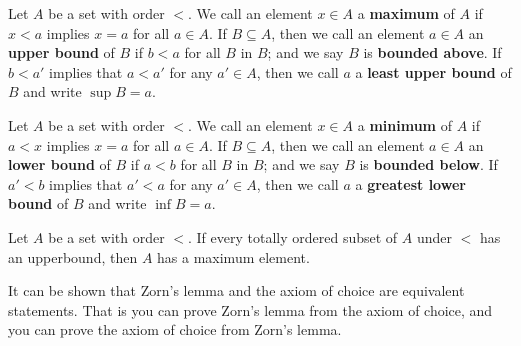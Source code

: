 \begin{definition}
    Let $A$ be a set with order  $<$. We call an element  $x \in A$ a
    \textbf{maximum} of $A$ if  $x<a$ implies  $x=a$ for all $a \in A$. If $B
    \subseteq A$, then we call an element $a \in A$ an \textbf{upper bound} of
    $B$ if  $b<a$ for all  $B$ in  $B$; and we say  $B$ is  \textbf{bounded
    above}. If $b<a'$ implies that  $a<a'$ for any  $a' \in A$, then we call
    $a$ a  \textbf{least upper bound} of $B$ and write  $\sup{B}=a$.
\end{definition}

\begin{definition}
    Let $A$ be a set with order  $<$. We call an element  $x \in A$ a
    \textbf{minimum} of $A$ if  $a<x$ implies  $x=a$ for all $a \in A$. If $B
    \subseteq A$, then we call an element $a \in A$ an \textbf{lower bound} of
    $B$ if  $a<b$ for all  $B$ in  $B$; and we say  $B$ is  \textbf{bounded
    below}. If $a'<b$ implies that  $a'<a$ for any  $a' \in A$, then we call
    $a$ a  \textbf{greatest lower bound} of $B$ and write  $\inf{B}=a$.
\end{definition}

\begin{theorem}\label{thm_2}
    Let $A$ be a set with order  $<$. If every totally ordered subset of  $A$
    under  $<$ has an upperbound, then  $A$ has a maximum element.
\end{theorem}
\begin{remark}
    It can be shown that Zorn's lemma and the axiom of choice are equivalent
    statements. That is you can prove Zorn's lemma from the axiom of choice, and
    you can prove the axiom of choice from Zorn's lemma.
\end{remark}

